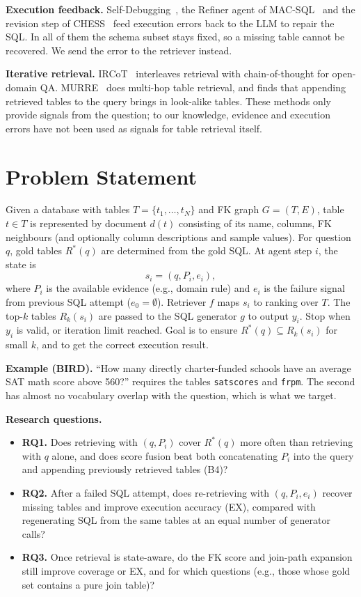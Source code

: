 \documentclass[sigconf,nonacm]{acmart}
\begin{document}
\textbf{Execution feedback.} Self-Debugging~\cite{selfdebug}, the Refiner agent of MAC-SQL~\cite{macsql} and the revision step of CHESS~\cite{chess} feed execution errors back to the LLM to repair the SQL. In all of them the schema subset stays fixed, so a missing table cannot be recovered. We send the error to the retriever instead.

\textbf{Iterative retrieval.} IRCoT~\cite{ircot} interleaves retrieval with chain-of-thought for open-domain QA. MURRE~\cite{murre} does multi-hop table retrieval, and finds that appending retrieved tables to the query brings in look-alike tables. These methods only provide signals from the question; to our knowledge, evidence and execution errors have not been used as signals for table retrieval itself.

\section{Problem Statement}

Given a database with tables $T=\{t_1,\dots,t_N\}$ and FK graph $G=(T,E)$, table $t\in T$ is represented by document $d(t)$ consisting of its name, columns, FK neighbours (and optionally column descriptions and sample values). For question $q$, gold tables $R^*(q)$ are determined from the gold SQL. At agent step $i$, the state is
\begin{equation}
s_i = (q, P_i, e_i),
\end{equation}
where $P_i$ is the available evidence (e.g., domain rule) and $e_i$ is the failure signal from previous SQL attempt ($e_0=\emptyset$). Retriever $f$ maps $s_i$ to ranking over $T$. The top-$k$ tables $R_k(s_i)$ are passed to the SQL generator $g$ to output $y_i$. Stop when $y_i$ is valid, or iteration limit reached. Goal is to ensure $R^*(q)\subseteq R_k(s_i)$ for small $k$, and to get the correct execution result.

\textbf{Example (BIRD).} ``How many directly charter-funded schools have an average SAT math score above 560?'' requires the tables \texttt{satscores} and \texttt{frpm}. The second has almost no vocabulary overlap with the question, which is what we target.

\textbf{Research questions.}
\begin{itemize}
\item \textbf{RQ1.} Does retrieving with $(q, P_i)$ cover $R^*(q)$ more often than retrieving with $q$ alone, and does score fusion beat both concatenating $P_i$ into the query and appending previously retrieved tables (B4)?
\item \textbf{RQ2.} After a failed SQL attempt, does re-retrieving with $(q, P_i, e_i)$ recover missing tables and improve execution accuracy (EX), compared with regenerating SQL from the same tables at an equal number of generator calls?
\item \textbf{RQ3.} Once retrieval is state-aware, do the FK score and join-path expansion still improve coverage or EX, and for which questions (e.g., those whose gold set contains a pure join table)?
\end{itemize}
\end{document}
